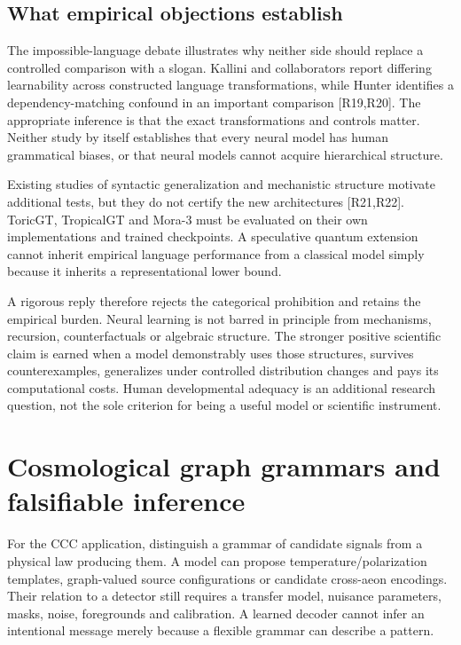 \subsection{What empirical objections establish}

The impossible-language debate illustrates why neither side should replace a controlled comparison with a slogan. Kallini and collaborators report differing learnability across constructed language transformations, while Hunter identifies a dependency-matching confound in an important comparison [R19,R20]. The appropriate inference is that the exact transformations and controls matter. Neither study by itself establishes that every neural model has human grammatical biases, or that neural models cannot acquire hierarchical structure.

Existing studies of syntactic generalization and mechanistic structure motivate additional tests, but they do not certify the new architectures [R21,R22]. ToricGT, TropicalGT and Mora-3 must be evaluated on their own implementations and trained checkpoints. A speculative quantum extension cannot inherit empirical language performance from a classical model simply because it inherits a representational lower bound.

A rigorous reply therefore rejects the categorical prohibition and retains the empirical burden. Neural learning is not barred in principle from mechanisms, recursion, counterfactuals or algebraic structure. The stronger positive scientific claim is earned when a model demonstrably uses those structures, survives counterexamples, generalizes under controlled distribution changes and pays its computational costs. Human developmental adequacy is an additional research question, not the sole criterion for being a useful model or scientific instrument.

\section{Cosmological graph grammars and falsifiable inference}
\label{sec:wb-language-cosmology}

For the CCC application, distinguish a grammar of candidate signals from a physical law producing them. A model can propose temperature/polarization templates, graph-valued source configurations or candidate cross-aeon encodings. Their relation to a detector still requires a transfer model, nuisance parameters, masks, noise, foregrounds and calibration. A learned decoder cannot infer an intentional message merely because a flexible grammar can describe a pattern.

